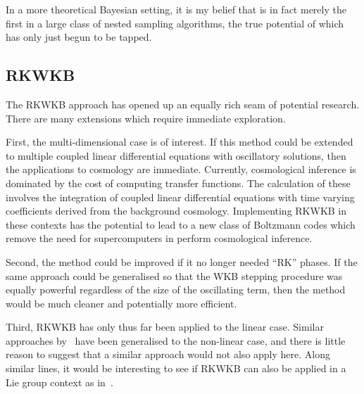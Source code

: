 In a more theoretical Bayesian setting, it is my belief that \PolyChord{} is in fact merely the first in a large class of nested sampling algorithms, the true potential of which has only just begun to be tapped.

\subsection*{RKWKB}
The RKWKB approach has opened up an equally rich seam of potential research. There are many extensions which require immediate exploration. 

First, the multi-dimensional case is of interest. If this method could be extended to multiple coupled linear differential equations with oscillatory solutions, then the applications to cosmology are immediate. Currently, cosmological inference is dominated by the cost of computing transfer functions. The calculation of these involves the integration of coupled linear differential equations with time varying coefficients derived from the background cosmology. Implementing RKWKB in these contexts has the potential to lead to a new class of Boltzmann codes which remove the need for supercomputers in perform cosmological inference.

Second, the method could be improved if it no longer needed ``RK'' phases. If the same approach could be generalised so that the WKB stepping procedure was equally powerful regardless of the size of the oscillating term, then the method would be much cleaner and potentially more efficient.

Third, RKWKB has only thus far been applied to the linear case. Similar approaches by~\cite{Iserles03onthe} have been generalised to the non-linear case, and there is little reason to suggest that a similar approach would not also apply here. Along similar lines, it would be interesting to see if RKWKB can also be applied in a Lie group context as in~\cite{Iserles00lie-groupmethods}.







